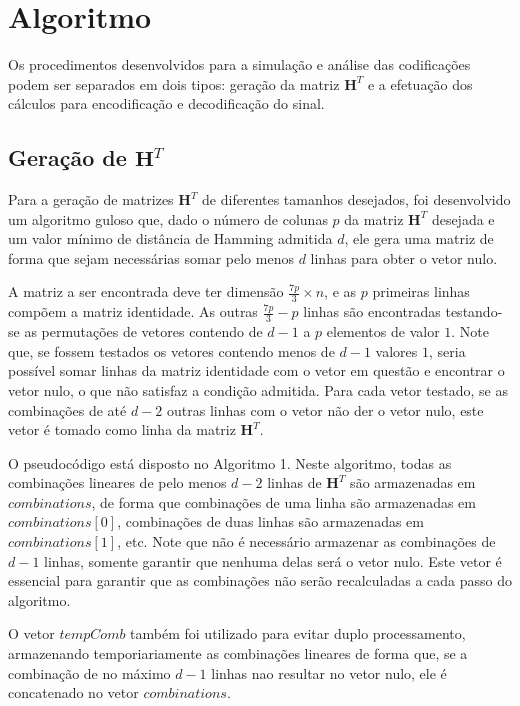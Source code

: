 \section{Algoritmo}

Os procedimentos desenvolvidos para a simulação e análise das codificações podem ser separados em dois tipos: geração da matriz $\textbf{H}^T$ e a efetuação dos cálculos para encodificação e decodificação do sinal.

\subsection{Geração de $\textbf{H}^T$}
Para a geração de matrizes $\textbf{H}^T$ de diferentes tamanhos desejados, foi desenvolvido um algoritmo guloso que, dado o número de colunas $p$ da matriz $\textbf{H}^T$ desejada e um valor mínimo de distância de Hamming admitida $d$, ele gera uma matriz de forma que sejam necessárias somar pelo menos $d$ linhas para obter o vetor nulo. 

A matriz a ser encontrada deve ter dimensão $\frac{7p}{3} \times n$, e as $p$ primeiras linhas compõem a matriz identidade. As outras $\frac{7p}{3} - p$ linhas são encontradas testando-se as permutações de vetores contendo de $d - 1$ a $p$ elementos de valor $1$. Note que, se fossem testados os vetores contendo menos de $d - 1$ valores $1$, seria possível somar linhas da matriz identidade com o vetor em questão e encontrar o vetor nulo, o que não satisfaz a condição admitida. Para cada vetor testado, se as combinações de até $d - 2$ outras linhas com o vetor não der o vetor nulo, este vetor é tomado como linha da matriz $\textbf{H}^T$.

O pseudocódigo está disposto no Algoritmo 1. Neste algoritmo, todas as combinações lineares de pelo menos $d - 2$ linhas de $\textbf{H}^T$ são armazenadas em $combinations$, de forma que combinações de uma linha são armazenadas em $combinations[0]$, combinações de duas linhas são armazenadas em $combinations[1]$, etc. Note que não é necessário armazenar as combinações de $d - 1$ linhas, somente garantir que nenhuma delas será o vetor nulo. Este vetor é essencial para garantir que as combinações não serão recalculadas a cada passo do algoritmo.

O vetor $tempComb$ também foi utilizado para evitar duplo processamento, armazenando temporiariamente as combinações lineares de forma que, se a combinação de no máximo $d - 1$ linhas nao resultar no vetor nulo, ele é concatenado no vetor $combinations$. 

